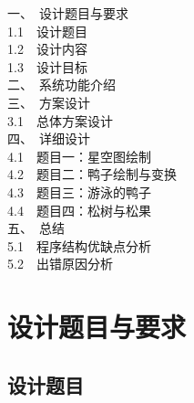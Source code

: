 \documentclass[12pt, a4paper]{article}
\begin{document}
\vspace{1.5em}

{
\renewcommand{\baselinestretch}{1.8}\selectfont
\noindent
一、\ 设计题目与要求 \dotfill \pageref{sec:one}\\
\hspace*{2em}1.1\ \ 设计题目 \dotfill \\
\hspace*{2em}1.2\ \ 设计内容 \dotfill \\
\hspace*{2em}1.3\ \ 设计目标 \dotfill \\
二、\ 系统功能介绍 \dotfill \pageref{sec:two}\\
三、\ 方案设计 \dotfill \pageref{sec:three}\\
\hspace*{2em}3.1\ \ 总体方案设计 \dotfill \\
四、\ 详细设计 \dotfill \pageref{sec:four}\\
\hspace*{2em}4.1\ \ 题目一：星空图绘制 \dotfill \\
\hspace*{2em}4.2\ \ 题目二：鸭子绘制与变换 \dotfill \\
\hspace*{2em}4.3\ \ 题目三：游泳的鸭子 \dotfill \\
\hspace*{2em}4.4\ \ 题目四：松树与松果 \dotfill \\
五、\ 总结 \dotfill \pageref{sec:five}\\
\hspace*{2em}5.1\ \ 程序结构优缺点分析 \dotfill \\
\hspace*{2em}5.2\ \ 出错原因分析 \dotfill \\
}

\newpage

\setcounter{page}{1}
\pagestyle{plain}

\section{设计题目与要求}\label{sec:one}

\subsection{设计题目}
\end{document}
